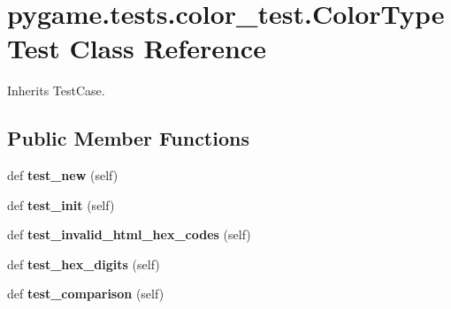 \hypertarget{classpygame_1_1tests_1_1color__test_1_1_color_type_test}{}\section{pygame.\+tests.\+color\+\_\+test.\+Color\+Type\+Test Class Reference}
\label{classpygame_1_1tests_1_1color__test_1_1_color_type_test}


Inherits Test\+Case.

\subsection*{Public Member Functions}
\begin{DoxyCompactItemize}
\item 
\mbox{\label{classpygame_1_1tests_1_1color__test_1_1_color_type_test_aabd72c8fd387431cb4990240189d0424}} 
def {\bfseries test\+\_\+new} (self)
\item 
\mbox{\label{classpygame_1_1tests_1_1color__test_1_1_color_type_test_a863653e4fd4743b2bab7fc197e18e652}} 
def {\bfseries test\+\_\+init} (self)
\item 
\mbox{\label{classpygame_1_1tests_1_1color__test_1_1_color_type_test_a4af4012412b30aea7865bab557a9ed48}} 
def {\bfseries test\+\_\+invalid\+\_\+html\+\_\+hex\+\_\+codes} (self)
\item 
\mbox{\label{classpygame_1_1tests_1_1color__test_1_1_color_type_test_a19e08864766fd4a9b6d13513e6fdc9ba}} 
def {\bfseries test\+\_\+hex\+\_\+digits} (self)
\item 
\mbox{\label{classpygame_1_1tests_1_1color__test_1_1_color_type_test_af170e67731d0ba2871d46b3a31dc17ff}} 
def {\bfseries test\+\_\+comparison} (self)
\item 
\mbox{\label{classpygame_1_1tests_1_1color__test_1_1_color_type_test_ad8c200362a9c5315190b0aaa47d99cf2}} 

\end{DoxyCompactItemize}
